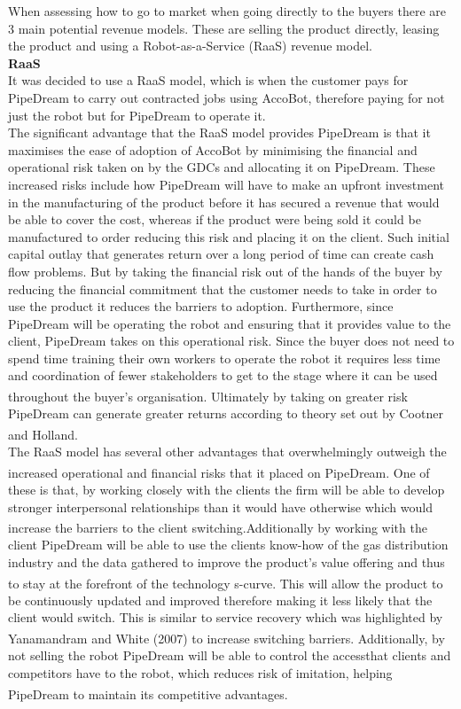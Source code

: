 \documentclass[11pt]{article}		%
\newcommand{\supercite}[1]{\textsuperscript{\cite{#1}}}		%
\begin{document}
            When assessing how to go to market when going directly to the buyers there are 3 main potential revenue models. These are selling the product directly, leasing the product and using a Robot-as-a-Service (RaaS) revenue model.
            \\
            \textbf{RaaS}
            \\
           It was decided to use a RaaS model, which is when the customer pays for PipeDream to carry out contracted jobs using AccoBot, therefore paying for not just the robot but for PipeDream to operate it. 
           \\ \hspace*{3ex}
           The significant advantage that the RaaS model provides PipeDream is that it maximises the ease of adoption of AccoBot by minimising the financial and operational risk taken on by the GDCs and allocating it on PipeDream.  These increased risks include how PipeDream will have to make an upfront investment in the manufacturing of the product before it has secured a revenue that would be able to cover the cost, whereas if the product were being sold it could be manufactured to order reducing this risk and placing it on the client. Such initial capital outlay that generates return over a long period of time can create cash flow problems. But by taking the financial risk out of the hands of the buyer by reducing the financial commitment that the customer needs to take in order to use the product it reduces the barriers to adoption. Furthermore, since PipeDream will be operating the robot and ensuring that it provides value to the client, PipeDream takes on this operational risk. Since the buyer does not need to spend time training their own workers to operate the robot it requires less time and coordination of fewer stakeholders to get to the stage where it can be used throughout the buyer’s organisation.\supercite{RaaS} Ultimately by taking on greater risk PipeDream can generate greater returns according to theory set out by Cootner and Holland\supercite{risk-return}.
\\ \hspace*{3ex}
The RaaS model has several other advantages that overwhelmingly outweigh the increased operational and financial risks that it placed on PipeDream.\supercite{RaaS} One of these is that, by working closely with the clients the firm will be able to develop stronger interpersonal relationships than it would have otherwise which would increase the barriers to the client switching.\supercite{B2Brelations}Additionally by working with the client PipeDream will be able to use the clients know-how of the gas distribution industry and the data gathered to improve the product’s value offering and thus to stay at the forefront of the technology s-curve.\supercite{Barney} This will allow the product to be continuously updated and improved therefore making it less likely that the client would switch. This is similar to service recovery which was highlighted by Yanamandram and White (2007)\supercite{customers} to increase switching barriers. Additionally, by not selling the robot PipeDream will be able to control the accessthat clients and competitors have to the robot, which reduces risk of imitation, helping PipeDream to maintain its competitive advantages.\supercite{Barney}
\end{document}

